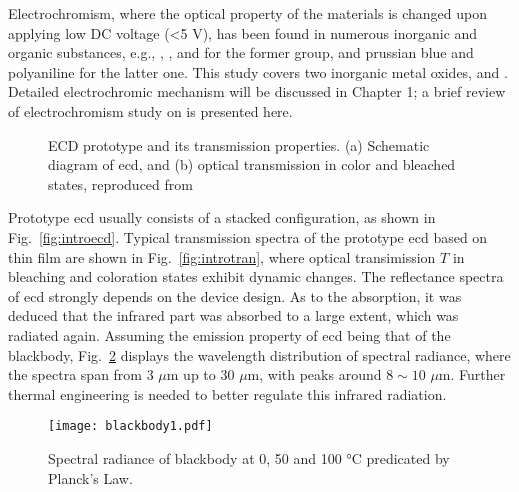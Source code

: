 Electrochromism, where the optical property of the materials is changed upon applying low DC voltage (\textless 5 V), has been found in numerous inorganic and organic substances, e.g., , , and  for the former group, and prussian blue and polyaniline for the latter one. This study covers two inorganic metal oxides,  and . Detailed electrochromic mechanism will be discussed in Chapter 1; a brief review of electrochromism study on  is presented here. 
\begin{figure}[htb]
\centering
{}\hspace{0.04\textwidth}
\caption[ECD prototype and its transmission properties]{ECD prototype and its transmission properties. (a) Schematic diagram of \gls{ecd}, and (b) optical transmission in color and bleached states, reproduced from \cite{Lampert1998}}
\label{fig:introec}
\end{figure}

Prototype \gls{ecd} usually consists of a stacked configuration, as shown in Fig.~\ref{fig:introecd}. Typical transmission spectra of the prototype \gls{ecd} based on  thin film are shown in Fig.~\ref{fig:introtran},\cite{Lampert1998} where optical transimission $T$ in bleaching and coloration states exhibit dynamic changes. The reflectance spectra of  \gls{ecd} strongly depends on the device design.\cite{OBrien1999} As to the absorption, it was deduced that the infrared part was absorbed to a large extent, which was radiated again. Assuming the emission property of \gls{ecd} being that of the blackbody, Fig.~\ref{fig:introbb} displays the wavelength distribution of spectral radiance, where the spectra span from 3 $\mu$m up to 30 $\mu$m, with peaks around $8\sim10$ $\mu$m. Further thermal engineering is needed to better regulate this infrared radiation. 

\begin{figure}[htb]
\centering
\texttt{[image: blackbody1.pdf]}
\caption[Spectral radiance of blackbody at 0, 50 and 100 \si{\degreeCelsius} predicated by Planck's Law]{Spectral radiance of blackbody at 0, 50 and 100 \si{\degreeCelsius} predicated by Planck's Law.}
\label{fig:introbb}
\end{figure}

